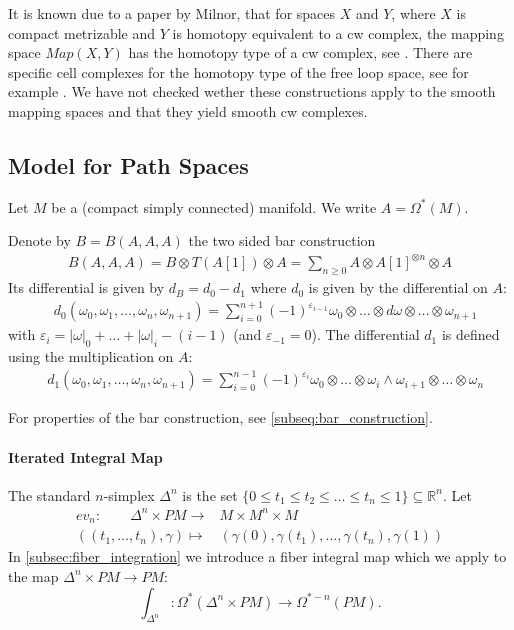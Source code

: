 \documentclass{scrartcl}
\theoremstyle{plain}
\theoremstyle{definition}
\newcommand{\R}{\mathbb R}
\renewcommand{\epsilon}{\varepsilon}
\newcommand{\abs}[1]{\left\lvert#1\right\rvert}
\renewcommand{\subset}{\subseteq}
\begin{document}
It is known due to a paper by Milnor, that for spaces $X$ and $Y$, where $X$ is compact metrizable and $Y$ is homotopy equivalent to a cw complex, the mapping space $Map(X, Y)$ has the homotopy type of a cw complex, see \cite{milnor1959spaces}. There are specific cell complexes for the homotopy type of the free loop space, see for example \cite{rivera2018combinatorial}. We have not checked wether these constructions apply to the smooth mapping spaces and that they yield smooth cw complexes. 




\subsection{Model for Path Spaces}

Let $M$ be a (compact simply connected) manifold. We write $A=\Omega^*(M)$. 

Denote by $B = B(A, A, A)$ the two sided bar construction
\begin{align*}
    B(A, A, A) = B\otimes T(A[1]) \otimes A = \sum_{n\geq 0} A\otimes A[1]^{\otimes n} \otimes A
\end{align*}
Its differential is given by $d_B = d_0 - d_1$ where $d_0$ is given by the differential on $A$:
\begin{align*}
    &d_0(\omega_0,\omega_1,\dots,\omega_n,\omega_{n+1}) = \sum_{i=0}^{n+1} (-1)^{\epsilon_{i-1}}\omega_0\otimes\dots\otimes d\omega \otimes\dots\otimes\omega_{n+1}
\end{align*}
with $\varepsilon_i = \abs\omega_0+\dots+\abs\omega_i - (i-1)$ (and $\epsilon_{-1} =0$). The differential $d_1$ is defined using the multiplication on $A$:
\begin{align*}
    &d_1(\omega_0,\omega_1,\dots,\omega_n,\omega_{n+1}) = \sum_{i=0}^{n-1}(-1)^{\epsilon_i}\omega_0\otimes \dots\otimes\omega_i\wedge\omega_{i+1}\otimes \dots\otimes \omega_{n}
\end{align*}

For properties of the bar construction, see \ref{subseq:bar_construction}. 

\paragraph{Iterated Integral Map} The standard $n$-simplex $\Delta^n$ is the set $\{0\leq t_1\leq t_2\leq \dots\leq t_n\leq 1\} \subset \R^n$. Let 
\begin{align*}
    ev_n\colon\qquad\Delta^n\times PM \to & M\times M^n\times M \\
    ((t_1,\dots, t_n), \gamma)\mapsto &(\gamma(0), \gamma(t_1), \dots, \gamma(t_n), \gamma(1))
\end{align*}
In \ref{subsec:fiber_integration} we introduce a fiber integral map which we apply to the map $\Delta^n\times PM \to PM$: 
$$\int_{\Delta^n}\colon \Omega^*(\Delta^n\times PM) \to \Omega^{*-n}(PM).$$
\end{document}
